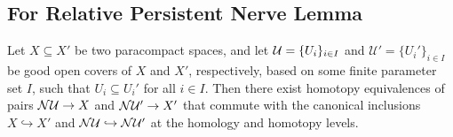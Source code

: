 %
%

\subsection{For Relative Persistent Nerve Lemma}

\begin{lemma}\label{lem:pers_nerve}
  Let $X\subseteq X'$ be two paracompact spaces, and let $\mathcal{U} = \{U_i\}_{i\in I}$ and $\mathcal{U}' = \{U_i'\}_{i\in I}$ be good open covers of $X$ and $X'$, respectively, based on some finite parameter set $I$, such that $U_i\subseteq U_i'$ for all $i\in I$.
  Then there exist homotopy equivalences of pairs $\mathcal{N}\mathcal{U}\to X$ and $\mathcal{N}\mathcal{U}'\to X'$ that commute with the canonical inclusions $X \hookrightarrow X'$ and $\mathcal{N}\mathcal{U}\hookrightarrow \mathcal{N}\mathcal{U}'$ at the homology and homotopy levels.
\end{lemma}


